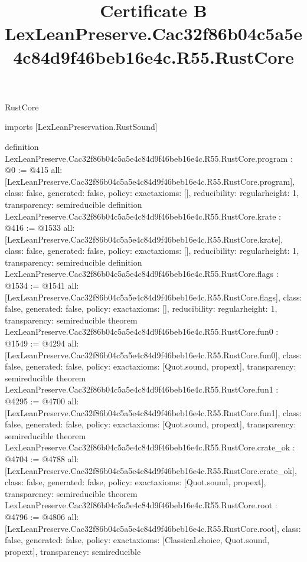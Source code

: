 \begin{lexlean}{RustCore}
\title{Certificate B LexLeanPreserve.Cac32f86b04c5a5e4c84d9f46beb16e4c.R55.RustCore}
\begin{coremodule}
imports [LexLeanPreservation.RustSound]

definition LexLeanPreserve.Cac32f86b04c5a5e4c84d9f46beb16e4c.R55.RustCore.program : @0 := @415 {
  all: [LexLeanPreserve.Cac32f86b04c5a5e4c84d9f46beb16e4c.R55.RustCore.program],
  class: false,
  generated: false,
  policy: exact{axioms: []},
  reducibility: regular{height: 1},
  transparency: semireducible
}
definition LexLeanPreserve.Cac32f86b04c5a5e4c84d9f46beb16e4c.R55.RustCore.krate : @416 := @1533 {
  all: [LexLeanPreserve.Cac32f86b04c5a5e4c84d9f46beb16e4c.R55.RustCore.krate],
  class: false,
  generated: false,
  policy: exact{axioms: []},
  reducibility: regular{height: 1},
  transparency: semireducible
}
definition LexLeanPreserve.Cac32f86b04c5a5e4c84d9f46beb16e4c.R55.RustCore.flags : @1534 := @1541 {
  all: [LexLeanPreserve.Cac32f86b04c5a5e4c84d9f46beb16e4c.R55.RustCore.flags],
  class: false,
  generated: false,
  policy: exact{axioms: []},
  reducibility: regular{height: 1},
  transparency: semireducible
}
theorem LexLeanPreserve.Cac32f86b04c5a5e4c84d9f46beb16e4c.R55.RustCore.fun0 : @1549 := @4294 {
  all: [LexLeanPreserve.Cac32f86b04c5a5e4c84d9f46beb16e4c.R55.RustCore.fun0],
  class: false,
  generated: false,
  policy: exact{axioms: [Quot.sound, propext]},
  transparency: semireducible
}
theorem LexLeanPreserve.Cac32f86b04c5a5e4c84d9f46beb16e4c.R55.RustCore.fun1 : @4295 := @4700 {
  all: [LexLeanPreserve.Cac32f86b04c5a5e4c84d9f46beb16e4c.R55.RustCore.fun1],
  class: false,
  generated: false,
  policy: exact{axioms: [Quot.sound, propext]},
  transparency: semireducible
}
theorem LexLeanPreserve.Cac32f86b04c5a5e4c84d9f46beb16e4c.R55.RustCore.crate_ok : @4704 := @4788 {
  all: [LexLeanPreserve.Cac32f86b04c5a5e4c84d9f46beb16e4c.R55.RustCore.crate_ok],
  class: false,
  generated: false,
  policy: exact{axioms: [Quot.sound, propext]},
  transparency: semireducible
}
theorem LexLeanPreserve.Cac32f86b04c5a5e4c84d9f46beb16e4c.R55.RustCore.root : @4796 := @4806 {
  all: [LexLeanPreserve.Cac32f86b04c5a5e4c84d9f46beb16e4c.R55.RustCore.root],
  class: false,
  generated: false,
  policy: exact{axioms: [Classical.choice, Quot.sound, propext]},
  transparency: semireducible
}


\end{coremodule}
\end{lexlean}
